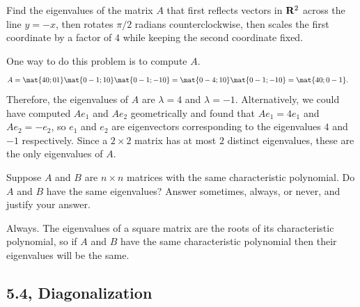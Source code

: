 \begin{problems}
\problem Find the eigenvalues of the matrix $A$ that first reflects
vectors in ${\bf R}^2$ across the line $y = -x$, then rotates
$\pi/2$ radians counterclockwise, then scales the first coordinate
by a factor of $4$ while keeping the second coordinate fixed.

\begin{solution} One way to do this problem is to compute $A$.
  \begin{align*}
    A & = \mat{4 0; 0 1} \mat{0 -1; 1 0} \mat{0 -1; -1 0}
        = \mat{0 -4; 1 0} \mat{0 -1; -1 0} 
        = \mat{4 0; 0 -1}.
  \end{align*}
  Therefore, the eigenvalues of $A$ are $\lambda = 4$ and
  $\lambda = -1$.  \newline \newline Alternatively, we could have
  computed $Ae_1$ and $Ae_2$ geometrically and found that
  $Ae_1 = 4 e_1$ and $Ae_2 = -e_2$, so $e_1$ and $e_2$ are
  eigenvectors corresponding to the eigenvalues $4$ and $-1$
  respectively.  Since a $2 \times 2$ matrix has at most $2$ distinct
  eigenvalues, these are the only eigenvalues of $A$.

  
\end{solution}


\problem Suppose $A$ and $B$ are $n \times n$ matrices with the same
characteristic polynomial.  Do $A$ and $B$ have the same eigenvalues?
Answer sometimes, always, or never, and justify your answer.

\begin{solution}
  Always.  The eigenvalues of a square matrix are the roots of its
  characteristic polynomial, so if $A$ and $B$ have the same characteristic
  polynomial then their eigenvalues will be the same.
\end{solution}

\end{problems}\setcounter{problem}{0}

\newpage

\subsection{5.4, Diagonalization}

